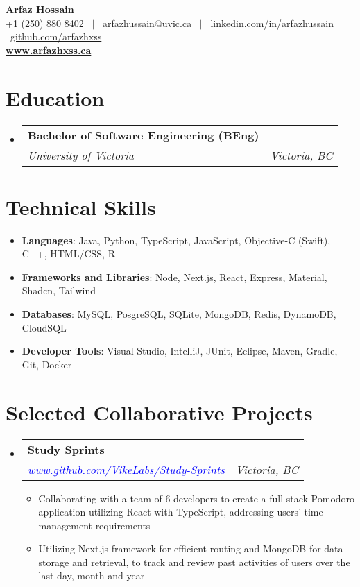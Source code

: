 \documentclass[a4paper,10pt]{article}
\makeatletter
\newcommand{\TechSkillItems}[2]
{\item \normalsize{\textbf{#1}{: #2}}}
\newcommand{\resumeItemDot}[1]
{\item \normalsize{#1}}
\newcommand{\resumeSubheading}[4]{
  \item
    \begin{tabular*}{\dimexpr\textwidth-1.2em\relax}{@{}l@{\extracolsep{\fill}}r@{}}
      \large \textbf{#1} & \fontsize{11}{12}\selectfont \text{#2} \\
      \textit{#3} & \textit{#4} \\
    \end{tabular*}\vspace{-2pt}
}
\newcommand{\resumeSubItem}[2]{\TechSkillItems{#1}{#2}}
\newenvironment{resumeSubHeadingListStart}
{\begin{itemize}[leftmargin=0.10in, label={}]}
{\end{itemize}}
\newenvironment{resumeItemListStart}
{\begin{itemize}[leftmargin=0.15in, label={$\bullet$}]}
{\end{itemize}}
\makeatother
\begin{document}
\begin{center}
    \textbf{\Huge Arfaz Hossain} \\ \vspace{2pt}
    +1 (250) 880 8402 \ $|$ \
    \href{mailto:arfazhussain@uvic.ca}
    {arfazhussain@uvic.ca} \ $|$ \ 
    \href{https://www.linkedin.com/in/arfazhussain}{linkedin.com/in/arfazhussain} \ $|$ \ 
    \href{https://github.com/arfazhxss}{github.com/arfazhxss} \vspace{2pt} \\
    \href{https://www.arfazhxss.ca}{\large \textbf{www.arfazhxss.ca}}
\end{center}

\section{Education}
\begin{resumeSubHeadingListStart}
\resumeSubheading
    {Bachelor of Software Engineering (BEng)}
    {Sept. 2021 – Present}
    {University of Victoria}
    {Victoria, BC}
\end{resumeSubHeadingListStart}

\section{Technical Skills}
\begin{resumeSubHeadingListStart}
\resumeSubItem{Languages}{Java, Python, TypeScript, JavaScript, Objective-C (Swift), C++, HTML/CSS, R}
\resumeSubItem{Frameworks and Libraries}{Node, Next.js, React, Express, Material, Shadcn, Tailwind}
\resumeSubItem{Databases}{MySQL, PosgreSQL, SQLite, MongoDB, Redis, DynamoDB, CloudSQL}
\resumeSubItem{Developer Tools}{Visual Studio, IntelliJ, JUnit, Eclipse, Maven, Gradle, Git, Docker}
\end{resumeSubHeadingListStart}

\section{Selected Collaborative Projects}
\begin{resumeSubHeadingListStart}
\resumeSubheading
    {Study Sprints}
    {Feb 2024 – Present}
    {\textcolor{blue}{www.github.com/VikeLabs/Study-Sprints}}
    {Victoria, BC}
\begin{resumeItemListStart}
    \resumeItemDot
    {Collaborating with a team of 6 developers to create a full-stack Pomodoro application utilizing React with TypeScript, addressing users' time management requirements}
    \resumeItemDot
    {Utilizing Next.js framework for efficient routing and MongoDB for data storage and retrieval, to track and review past activities of users over the last day, month and year}
\end{resumeItemListStart}
\end{resumeSubHeadingListStart}
\end{document}
